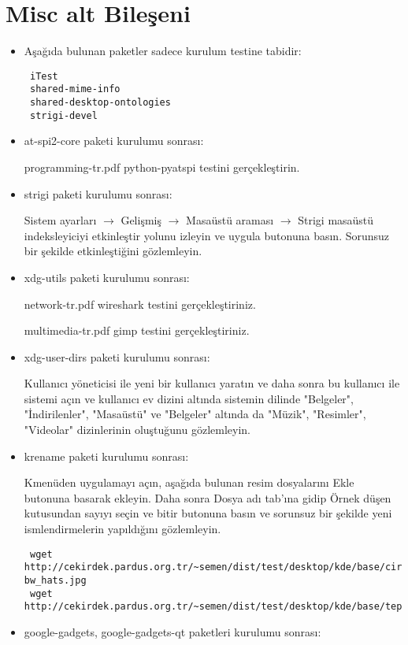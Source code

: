 \documentclass[a4paper,10pt]{article}
\begin{document}
\section{Misc alt Bileşeni}
\begin{itemize}
\item Aşağıda bulunan paketler sadece kurulum testine tabidir:
\begin{verbatim}
 iTest
 shared-mime-info
 shared-desktop-ontologies
 strigi-devel
\end{verbatim}

\item at-spi2-core paketi kurulumu sonrası:

programming-tr.pdf python-pyatspi testini gerçekleştirin.
\item strigi paketi kurulumu sonrası: 

Sistem ayarları $\rightarrow$ Gelişmiş $\rightarrow$ Masaüstü araması $\rightarrow$  Strigi masaüstü indeksleyiciyi etkinleştir yolunu izleyin ve uygula butonuna basın. Sorunsuz bir şekilde etkinleştiğini gözlemleyin.

\item xdg-utils paketi kurulumu sonrası:

network-tr.pdf wireshark testini gerçekleştiriniz.

multimedia-tr.pdf gimp testini gerçekleştiriniz.

\item xdg-user-dirs paketi kurulumu sonrası:

Kullanıcı yöneticisi ile yeni bir kullanıcı yaratın ve daha sonra bu kullanıcı ile sistemi açın ve kullanıcı ev dizini altında sistemin dilinde "Belgeler", "İndirilenler", "Masaüstü" ve "Belgeler" altında da "Müzik", "Resimler", "Videolar" dizinlerinin oluştuğunu gözlemleyin.
\item krename paketi kurulumu sonrası:

Kmenüden uygulamayı açın, aşağıda bulunan resim dosyalarını Ekle butonuna basarak ekleyin. Daha sonra Dosya adı tab'ına gidip Örnek düşen kutusundan sayıyı seçin ve bitir butonuna basın ve sorunsuz bir şekilde yeni ismlendirmelerin yapıldığını gözlemleyin.
\begin{verbatim}
 wget http://cekirdek.pardus.org.tr/~semen/dist/test/desktop/kde/base/circus-bw_hats.jpg
 wget http://cekirdek.pardus.org.tr/~semen/dist/test/desktop/kde/base/tepecik_01.png
\end{verbatim}

\item google-gadgets, google-gadgets-qt  paketleri kurulumu sonrası:


\end{itemize}
\end{document}
